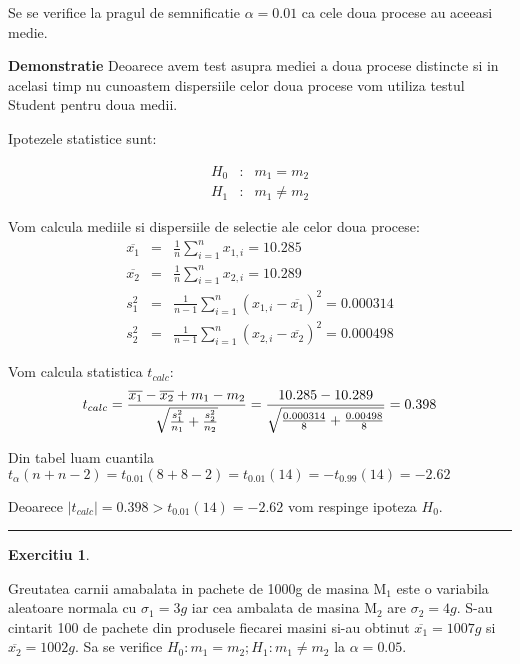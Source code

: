 \documentclass{article}
\newtheorem{exercise}[theorem]{Exercitiu}
\newenvironment{proof}[1][Proof]{\noindent\textbf{Demonstratie} }{\ \rule{0.5em}{0.5em}}
\begin{document}
Se se verifice la pragul de semnificatie $\alpha =0.01$ ca cele doua procese
au aceeasi medie.

\begin{proof}
Deoarece avem test asupra mediei a doua procese distincte si in acelasi timp
nu cunoastem dispersiile celor doua procese vom utiliza testul Student
pentru doua medii.

Ipotezele statistice sunt:

\begin{eqnarray*}
H_{0} &:&m_{1}=m_{2} \\
H_{1} &:&m_{1}\neq m_{2}
\end{eqnarray*}

Vom calcula mediile si dispersiile de selectie ale celor doua procese:%
\begin{eqnarray*}
\overline{x_{1}} &=&\frac{1}{n}\sum_{i=1}^{n}x_{1,i}=10.285 \\
\overline{x_{2}} &=&\frac{1}{n}\sum_{i=1}^{n}x_{2,i}=10.289 \\
s_{1}^{2} &=&\frac{1}{n-1}\sum_{i=1}^{n}(x_{1,i}-\overline{x_{1}}%
)^{2}=0.000314 \\
s_{2}^{2} &=&\frac{1}{n-1}\sum_{i=1}^{n}(x_{2,i}-\overline{x_{2}}%
)^{2}=0.000498
\end{eqnarray*}

Vom calcula statistica $t_{calc}$:%
\[
t_{calc}=\frac{\overline{x_{1}}-\overline{x_{2}}+m_{1}-m_{2}}{\sqrt{\frac{%
s_{1}^{2}}{n_{1}}+\frac{s_{2}^{2}}{n_{2}}}}=\frac{10.285-10.289}{\sqrt{\frac{%
0.000314}{8}+\frac{0.00498}{8}}}=0.398
\]

Din tabel luam cuantila $t_{\alpha
}(n+n-2)=t_{0.01}(8+8-2)=t_{0.01}(14)=-t_{0.99}(14)=-2.62$

Deoarece $\left\vert t_{calc}\right\vert =0.398>t_{0.01}(14)=-2.62$ vom
respinge ipoteza $H_{0}$.
\end{proof}

\begin{exercise}
\end{exercise}

Greutatea carnii amabalata in pachete de 1000g de masina M$_{1}$ este o
variabila aleatoare normala cu $\sigma _{1}=3g$ iar cea ambalata de masina M$%
_{2}$ are $\sigma _{2}=4g$. S-au cintarit 100 de pachete din produsele
fiecarei masini si-au obtinut $\overline{x_{1}}=1007g$ si $\overline{x_{2}}%
=1002g$. Sa se verifice $H_{0}:m_{1}=m_{2};H_{1}:m_{1}\neq m_{2}$ la $\alpha
=0.05$.
\end{document}
